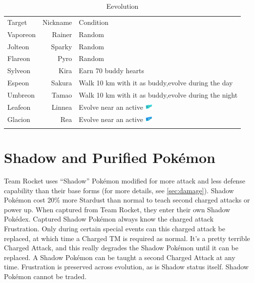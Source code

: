 \begin{table}
\centering
\begin{tabular}{lrp{}}
  Target & Nickname & Condition\\
  \Midrule
  Vaporeon & Rainer & Random\\
  Jolteon & Sparky & Random\\
  Flareon & Pyro & Random\\
  Sylveon & Kira & Earn 70 buddy hearts \\
  Espeon & Sakura & Walk 10 km with it as buddy,\newline evolve during the day\\
  Umbreon & Tamao & Walk 10 km with it as buddy,\newline evolve during the night\\
  Leafeon & Linnea & Evolve near an active \includegraphics[width=1em,height=1em]{images/rainylure.png} \\
  Glacion & Rea & Evolve near an active \includegraphics[width=1em,height=1em]{images/glaciallure.png} \\\\
\end{tabular}
  \caption{Eevolution\label{table:eevee}}
\end{table}

\section{Shadow and Purified Pokémon\label{sec:shadow}}
Team Rocket uses ``Shadow'' Pokémon modified for more attack
 and less defense capability than their base forms (for more details,
 see \autoref{sec:damage}).
Shadow Pokémon cost 20\% more Stardust than normal to teach second charged attacks or power up.
When captured from Team Rocket, they enter their own Shadow Pokédex.
Captured Shadow Pokémon always know the charged attack Frustration.
Only during certain special events can this charged attack be replaced,
 at which time a Charged TM is required as normal.
It's a pretty terrible Charged Attack, and this really degrades the
 Shadow Pokémon until it can be replaced.
A Shadow Pokémon can be taught a second Charged Attack at any time.
Frustration is preserved across evolution, as is Shadow status itself.
Shadow Pokémon cannot be traded.

